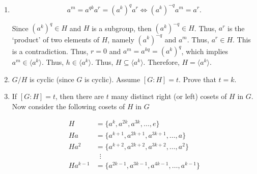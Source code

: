 \documentclass[12pt]{article}
\makeatletter
\theoremstyle{definition}
\theoremstyle{remark}
\renewenvironment{proof}[1][\proofname]{\par
  \pushQED{\qed}%
  \normalfont \topsep6\p@\@plus6\p@\relax
  \list{}{\leftmargin=0mm
          \rightmargin=4mm
          \settowidth{\itemindent}{\itshape#1}%
          \labelwidth=\itemindent
          \parsep=0pt \listparindent=\parindent 
  }
  \item[\hskip\labelsep
        \itshape
    #1\@addpunct{.}]\ignorespaces
}{%
  \popQED\endlist\@endpefalse
}
\let\oldproofname=\proofname
\renewcommand{\proofname}{\bf{\textit{\oldproofname}}}
\makeatother
\begin{document}
\begin{enumerate}[leftmargin=*]
\begin{enumerate}[label=(\alph*)]
\begin{proof}
                    \begin{equation*}
                        a^m=a^{qk}a^r=(a^k)^qa^r\Leftrightarrow (a^k)^{-q}a^m=a^r.
                    \end{equation*}
                    
                    Since $(a^k)^q\in H$ and $H$ is a subgroup, then $(a^k)^{-q}\in H$. Thus, $a^r$ is the `product' of two elements of $H$, namely $(a^k)^{-q}$ and $a^m$. Thus, $a^r\in H$. This is a contradiction. Thus, $r=0$ and $a^m=a^{kq}=(a^k)^q$, which implies $a^m\in\langle a^k\rangle$. Thus, $h\in\langle a^k\rangle$. Thus, $H\subseteq\langle a^k\rangle$. Therefore, $H=\langle a^k\rangle$.
                \end{proof}
                
            \item $G/H$ is cyclic (since $G$ is cyclic). Assume $[G\colon H]=t$. Prove that $t=k$.
                \begin{proof}
                
                    If $[G\colon H]=t$, then there are $t$ many distinct right (or left) cosets of $H$ in $G$. Now consider the following cosets of $H$ in $G$
                    
                    \begin{equation*}
                        \begin{split}
                            H        &= \{a^k, a^{2k}, a^{3k},\dots, e\} \\
                            Ha       &= \{a^{k+1}, a^{2k+1}, a^{3k+1}, \dots, a\} \\
                            Ha^2     &= \{a^{k+2}, a^{2k+2}, a^{3k+2}, \dots, a^2\} \\
                                     &\;\;\vdots \\
                            Ha^{k-1} &= \{a^{2k-1}, a^{3k-1}, a^{4k-1},\dots, a^{k-1}\}
                        \end{split}
                    \end{equation*}
                    

\end{proof}
\end{enumerate}
\end{enumerate}
\end{document}
